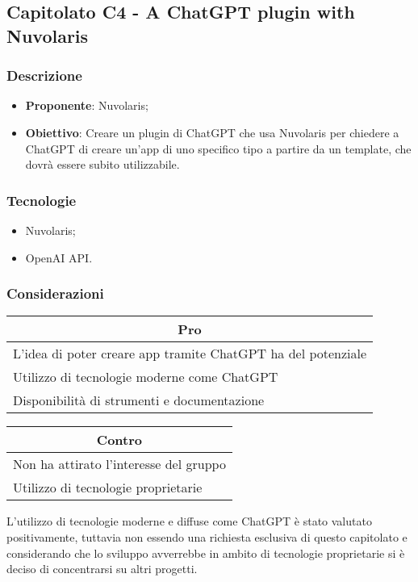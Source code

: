\subsection{Capitolato C4 - A ChatGPT plugin with Nuvolaris}


\subsubsection{Descrizione}
\begin{itemize}
    \item \textbf{Proponente}: Nuvolaris;
    \item \textbf{Obiettivo}: Creare un plugin di ChatGPT che usa Nuvolaris per chiedere a ChatGPT di creare un'app di uno specifico tipo a partire da un template, che dovrà essere subito utilizzabile.
\end{itemize}


\subsubsection{Tecnologie}
\begin{itemize}
    \item Nuvolaris;
    \item OpenAI API.
\end{itemize}


\subsubsection{Considerazioni}
\begin{minipage}[t]{0.45\linewidth}
    \vspace{0pt}
    {\renewcommand{\arraystretch}{1.5}
    \begin{tabular}{p{1\linewidth}}
        \multicolumn{1}{c}{\textbf{Pro}} \\
        \midrule
        L'idea di poter creare app tramite ChatGPT ha del potenziale \\
        Utilizzo di tecnologie moderne come ChatGPT \\
        Disponibilità di strumenti e documentazione \\
        \hline
    \end{tabular}
    }
\end{minipage}
\hspace{0.05\linewidth}
\begin{minipage}[t]{0.45\linewidth}
    \vspace{0pt}
    {\renewcommand{\arraystretch}{1.5}
    \begin{tabular}{p{1\linewidth}}
        \multicolumn{1}{c}{\textbf{Contro}} \\
        \midrule
        Non ha attirato l'interesse del gruppo \\
        Utilizzo di tecnologie proprietarie \\
        \hline
    \end{tabular}
    }
\end{minipage}
\vspace{1em}

L'utilizzo di tecnologie moderne e diffuse come ChatGPT è stato valutato positivamente, tuttavia non essendo una richiesta esclusiva di questo capitolato e considerando che lo sviluppo avverrebbe in ambito di tecnologie proprietarie si è deciso di concentrarsi su altri progetti.